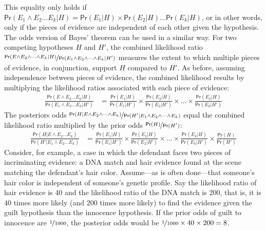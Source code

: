 \documentclass{article}
\newcommand{\pr}{\mathsf{Pr}}
\begin{document}
%
This equality only holds if $\pr(E_1 \wedge E_2 \dots E_k \vert H)=\pr(E_1| H) \times \pr(E_2 \vert H) \dots \pr(E_k \vert H)$, or in other words, only if the pieces of evidence are independent of each other given the hypothesis. 
%
%
The odds version of Bayes' theorem can be used in a similar way. For two competing hypotheses $H$ and $H'$, the combined likelihood ratio $\nicefrac{\pr(E \wedge E_2 \wedge \dots \wedge E_k \vert H)}{\pr(E_1\wedge E_2 \wedge \dots \wedge E_k \vert H')}$ 
measures the extent to which multiple pieces of evidence, in conjunction, support $H$ compared to $H'$.  As before, assuming independence between pieces of evidence, the combined likelihood results 
by multiplying 
the likelihood ratios associated with each piece of evidence:
%
\begin{align*}\frac{\pr(E \wedge E_2 \dots E_k \vert H)}{\pr(E_1\wedge E_2 \dots E_k \vert H')} & = \frac{\pr(E_1 \vert H)} {\pr(E_1 \vert H')}\times \frac{\pr(E_2 \vert H)} {\pr(E_2 \vert H')} \times \dots \times \frac{\pr(E_k \vert H)} {\pr(E_k \vert H')} \end{align*}
%
The posteriors odds $\nicefrac{\pr( H \vert E \wedge E_2 \wedge \dots \wedge E_k)}{\pr(H' \vert E_1\wedge E_2 \wedge \dots \wedge E_k)}$ equal the combined likelihood ratio multiplied by the prior odds $\nicefrac{\pr(H)}{\pr(H')}$:
%
\begin{align*}\frac{\pr( H \vert E \wedge E_2  \dots E_k)}{\pr(H' \vert E_1\wedge E_2 \dots E_k)} & = \frac{\pr(E_1 \vert H)} {\pr(E_1 \vert H')}\times \frac{\pr(E_2 \vert H)} {\pr(E_2 \vert H')} \times \dots \times \frac{\pr(E_k \vert H)} {\pr(E_k \vert H')} \times \frac{\pr(H)}{\pr(H')} \end{align*}
%
Consider, for example, a case in which the defendant faces two pieces of incriminating evidence: a DNA match and hair evidence found at the scene matching the defendant's hair color.
Assume---as is often 
done---that someone's hair color is independent of someone's genetic profile. Say the likelihood ratio of hair evidence is 40 and the likelihood ratio of the DNA match is 200, that is, it is 40 times more likely (and 200 times more likely) to find the evidence given the guilt hypothesis than the innocence hypothesis. If the prior odds of guilt to innocence are $\nicefrac{1}{1000}$, the posterior odds would be $\nicefrac{1}{1000}\times 40\times 200=8$.  
\end{document}
